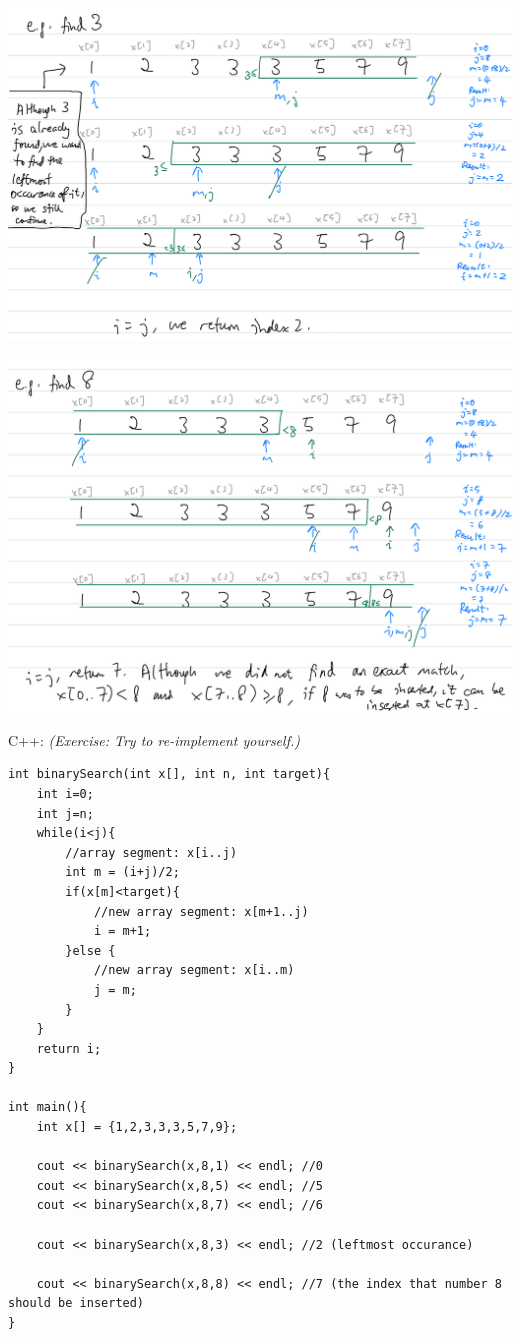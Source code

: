 \includegraphics[width=14cm]{images/ch7-binarysearch3.png}

\includegraphics[width=14cm]{images/ch7-binarysearch8.png}

\pagebreak

C++: \textit{(Exercise:  Try to re-implement yourself.)}

\begin{lstlisting}
int binarySearch(int x[], int n, int target){
    int i=0;
    int j=n;
    while(i<j){
        //array segment: x[i..j)
        int m = (i+j)/2;
        if(x[m]<target){
            //new array segment: x[m+1..j)
            i = m+1;
        }else {
            //new array segment: x[i..m)
            j = m;
        }
    }
    return i;
}

int main(){
    int x[] = {1,2,3,3,3,5,7,9};

    cout << binarySearch(x,8,1) << endl; //0
    cout << binarySearch(x,8,5) << endl; //5
    cout << binarySearch(x,8,7) << endl; //6

    cout << binarySearch(x,8,3) << endl; //2 (leftmost occurance)

    cout << binarySearch(x,8,8) << endl; //7 (the index that number 8 should be inserted)
}
\end{lstlisting}

